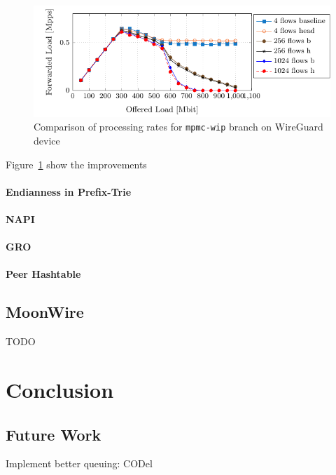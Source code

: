 \documentclass[IN,11pt,twoside,openright,master,english]{tumthesis}
\begin{document}
	\begin{figure}
		\centering
		\includegraphics[width=1\linewidth]{figures/mpmc-wip-wg0-compare-encrypt-64bytes-omastar}
		\caption{Comparison of processing rates for \texttt{mpmc-wip} branch on WireGuard device}
		\label{fig:mpmc-wip-wg0-compare-encrypt-64bytes-omastar}
	\end{figure}
	
	Figure~\ref{fig:mpmc-wip-wg0-compare-encrypt-64bytes-omastar} show the improvements 
	
	\subsubsection{Endianness in Prefix-Trie}
	
	\subsubsection{NAPI}
	
	\subsubsection{GRO}
	
	\subsubsection{Peer Hashtable}
	
\section{MoonWire}
TODO



\chapter{Conclusion}
\label{chap:conclusion}
\section{Future Work}
	Implement better queuing: CODel
\end{document}
